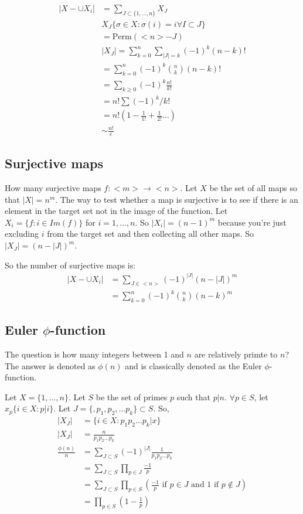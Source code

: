 \documentclass[12pt]{article}
\theoremstyle{definition}
\begin{document}
\begin{align*}
    |X - \cup X_i| &= \sum_{J \subset \{1, \ldots, n\}} X_J \\
    & X_J \{ \sigma \in X: \sigma(i) = i \forall I \subset J\} \\
    &= \mathrm{Perm}(<n> - J) \\
    & |X_J| = \sum_{k = 0}^n \sum_{|J| = k} (-1)^k (n - k)!  \\
    &= \sum_{k = 0}^n (-1)^k {n \choose k}(n - k)! \\
    &= \sum_{k \ge 0} (-1)^k \frac{n!}{k!} \\
    &= n! \sum (-1)^k / k!  \\
    &= n!(1 - \frac{1}{1!} + \frac{1}{2!} \ldots) \\
    &\sim \frac{n!}{e}
\end{align*}

\subsection{Surjective maps}

How many surjective maps $f: <m> \rightarrow <n>$. Let $X$ be the set of all
maps so that $|X| = n^m$. The way to test whether a map is surjective is to see
if there is an element in the target set not in the image of the function.  Let
$X_i = \{f : i \in Im(f)\}$ for $i = 1, \ldots, n$. So $|X_i| = (n - 1)^m$
because you're just excluding $i$ from the target set and then collecting all
other maps.  So $|X_J| = (n - |J|)^m$. 

So the number of surjective maps is:
\begin{align*}
    |X - \cup X_i| &= \sum_{J \in <n>} (-1)^{|J|} (n - |J|)^m \\
    &= \sum_{k = 0}^n (-1)^k { n \choose k } (n - k)^m
\end{align*}

\subsection{Euler $\phi$-function}

The question is how many integers between 1 and $n$ are relatively primte to
$n$? The answer is denoted as $\phi(n)$ and is classically denoted as the Euler
$\phi$-function.

Let $X = \{1, \ldots, n\}$. Let $S$ be the set of primes $p$ such that $p | n$.
$\forall p \in S$, let $x_p \{i \in X : p | i\}$. Let $J = \{,p_1, p_2, \ldots
p_k\} \subset S$. So, 
\begin{align*}
    |X_J| &= \{i \in X : p_1p_2\ldots p_k | x\} \\
    |X_J| &= \frac{n}{p_1p_2\ldots p_k} \\
    \frac{\phi(n)}{n} &= \sum_{J \subset S} (-1)^{|J|} \frac{1}{p_1p_2\ldots p_k} \\
    &= \sum_{J \subset S} \prod_{p \in J} \frac{-1}{p} \\
    &=  \sum_{J \subset S} \prod_{p \in S} \left(\frac{-1}{p} \text{ if $p \in J$ and 1 if $p \notin J$} \right) \\
    &= \prod_{p \in S}\left(1 - \frac{1}{p}\right) \\
\end{align*}
\end{document}
